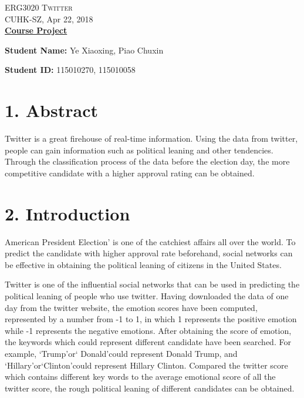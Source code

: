 \documentclass[12pt,a4paper]{article}
\begin{document}
\begin{center}
\textsc{ERG3020 Twitter} \\
CUHK-SZ, Apr 22, 2018
\\[\baselineskip]
		
\textbf{\underline{Course Project}}
\end{center}
	
\noindent\textbf{Student Name:}  Ye Xiaoxing, Piao Chuxin

\noindent\textbf{Student ID:}  115010270, 115010058
	
\noindent\hrulefill


\section*{1. Abstract}

      Twitter is a great firehouse of real-time information. Using the data from twitter, people can gain information such as political leaning and other tendencies. Through the classification process of the data before the election day, the more competitive candidate with a higher approval rating can be obtained.



\section*{2. Introduction}

     American President Election’ is one of the catchiest affairs all over the world. To predict the candidate with higher approval rate beforehand, social networks can be effective in obtaining the political leaning of citizens in the United States. 

	Twitter is one of the influential social networks that can be used in predicting the political leaning of people who use twitter. Having downloaded the data of one day from the twitter website, the emotion scores have been computed, represented by a number from -1 to 1, in which 1 represents the positive emotion while -1 represents the negative emotions. After obtaining the score of emotion, the keywords which could represent different candidate have been searched. For example, ‘Trump’or‘ Donald’could represent Donald Trump, and ‘Hillary’or‘Clinton’could represent Hillary Clinton. Compared the twitter score which contains different key words to the average emotional score of all the twitter score, the rough political leaning of different candidates can be obtained.
\end{document}
